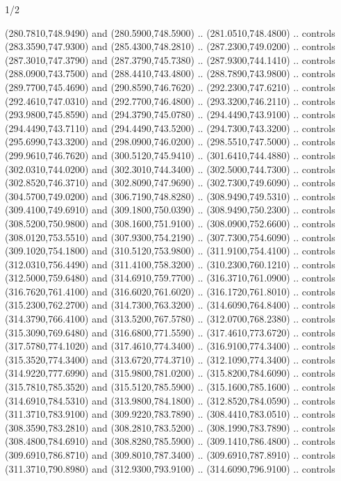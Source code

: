 \begin{flagdescription}{1/2}
\begin{scope}[xshift=0.5\flaglength]
\begin{scope}[scale=0.00745\flagwidth,xshift=-12.1mm,yshift=41.7mm]
\begin{scope}[y=0.80pt, x=0.80pt, yscale=-1, xscale=1, inner sep=0pt, outer sep=0pt]
\begin{scope}[cm={{1.33333,0.0,0.0,-1.33333,(0.0,114.66667)}}]
\begin{scope}[scale=0.100]
  (280.7810,748.9490) and (280.5900,748.5900) .. (281.0510,748.4800) .. controls
  (283.3590,747.9300) and (285.4300,748.2810) .. (287.2300,749.0200) .. controls
  (287.3010,747.3790) and (287.3790,745.7380) .. (287.9300,744.1410) .. controls
  (288.0900,743.7500) and (288.4410,743.4800) .. (288.7890,743.9800) .. controls
  (289.7700,745.4690) and (290.8590,746.7620) .. (292.2300,747.6210) .. controls
  (292.4610,747.0310) and (292.7700,746.4800) .. (293.3200,746.2110) .. controls
  (293.9800,745.8590) and (294.3790,745.0780) .. (294.4490,743.9100) .. controls
  (294.4490,743.7110) and (294.4490,743.5200) .. (294.7300,743.3200) .. controls
  (295.6990,743.3200) and (298.0900,746.0200) .. (298.5510,747.5000) .. controls
  (299.9610,746.7620) and (300.5120,745.9410) .. (301.6410,744.4880) .. controls
  (302.0310,744.0200) and (302.3010,744.3400) .. (302.5000,744.7300) .. controls
  (302.8520,746.3710) and (302.8090,747.9690) .. (302.7300,749.6090) .. controls
  (304.5700,749.0200) and (306.7190,748.8280) .. (308.9490,749.5310) .. controls
  (309.4100,749.6910) and (309.1800,750.0390) .. (308.9490,750.2300) .. controls
  (308.5200,750.9800) and (308.1600,751.9100) .. (308.0900,752.6600) .. controls
  (308.0120,753.5510) and (307.9300,754.2190) .. (307.7300,754.6090) .. controls
  (309.1020,754.1800) and (310.5120,753.9800) .. (311.9100,754.4100) .. controls
  (312.0310,756.4490) and (311.4100,758.3200) .. (310.2300,760.1210) .. controls
  (312.5000,759.6480) and (314.6910,759.7700) .. (316.3710,761.0900) .. controls
  (316.7620,761.4100) and (316.6020,761.6020) .. (316.1720,761.8010) .. controls
  (315.2300,762.2700) and (314.7300,763.3200) .. (314.6090,764.8400) .. controls
  (314.3790,766.4100) and (313.5200,767.5780) .. (312.0700,768.2380) .. controls
  (315.3090,769.6480) and (316.6800,771.5590) .. (317.4610,773.6720) .. controls
  (317.5780,774.1020) and (317.4610,774.3400) .. (316.9100,774.3400) .. controls
  (315.3520,774.3400) and (313.6720,774.3710) .. (312.1090,774.3400) .. controls
  (314.9220,777.6990) and (315.9800,781.0200) .. (315.8200,784.6090) .. controls
  (315.7810,785.3520) and (315.5120,785.5900) .. (315.1600,785.1600) .. controls
  (314.6910,784.5310) and (313.9800,784.1800) .. (312.8520,784.0590) .. controls
  (311.3710,783.9100) and (309.9220,783.7890) .. (308.4410,783.0510) .. controls
  (308.3590,783.2810) and (308.2810,783.5200) .. (308.1990,783.7890) .. controls
  (308.4800,784.6910) and (308.8280,785.5900) .. (309.1410,786.4800) .. controls
  (309.6910,786.8710) and (309.8010,787.3400) .. (309.6910,787.8910) .. controls
  (311.3710,790.8980) and (312.9300,793.9100) .. (314.6090,796.9100) .. controls

\end{scope}
\end{scope}
\end{scope}
\end{scope}
\end{scope}
\end{flagdescription}
